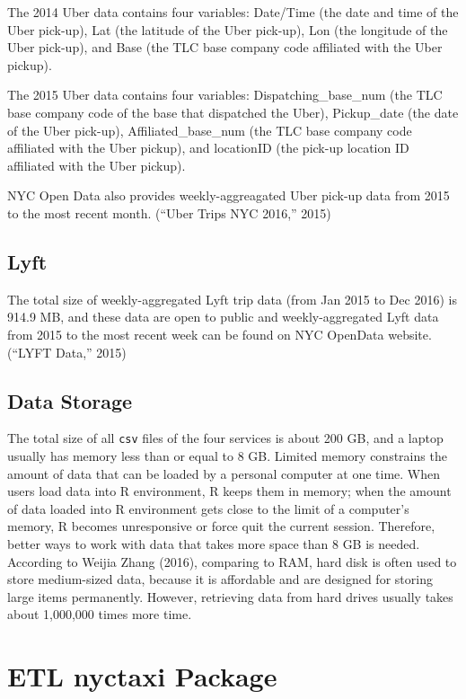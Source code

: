\documentclass[12pt,twoside]{reedthesis}
\theoremstyle{definition}
\theoremstyle{definition}
\theoremstyle{definition}
\theoremstyle{remark}
\begin{document}
The 2014 Uber data contains four variables: Date/Time (the date and time
of the Uber pick-up), Lat (the latitude of the Uber pick-up), Lon (the
longitude of the Uber pick-up), and Base (the TLC base company code
affiliated with the Uber pickup).

The 2015 Uber data contains four variables: Dispatching\_base\_num (the
TLC base company code of the base that dispatched the Uber),
Pickup\_date (the date of the Uber pick-up), Affiliated\_base\_num (the
TLC base company code affiliated with the Uber pickup), and locationID
(the pick-up location ID affiliated with the Uber pickup).

NYC Open Data also provides weekly-aggreagated Uber pick-up data from
2015 to the most recent month. (``Uber Trips NYC 2016,'' 2015)

\subsection{Lyft}\label{lyft-1}

The total size of weekly-aggregated Lyft trip data (from Jan 2015 to Dec
2016) is 914.9 MB, and these data are open to public and
weekly-aggregated Lyft data from 2015 to the most recent week can be
found on NYC OpenData website. (``LYFT Data,'' 2015)

\subsection{Data Storage}\label{data-storage}

The total size of all \texttt{csv} files of the four services is about
200 GB, and a laptop usually has memory less than or equal to 8 GB.
Limited memory constrains the amount of data that can be loaded by a
personal computer at one time. When users load data into R environment,
R keeps them in memory; when the amount of data loaded into R
environment gets close to the limit of a computer's memory, R becomes
unresponsive or force quit the current session. Therefore, better ways
to work with data that takes more space than 8 GB is needed. According
to Weijia Zhang (2016), comparing to RAM, hard disk is often used to
store medium-sized data, because it is affordable and are designed for
storing large items permanently. However, retrieving data from hard
drives usually takes about 1,000,000 times more time.

\section{ETL nyctaxi Package}\label{etl-nyctaxi-package}
\end{document}
